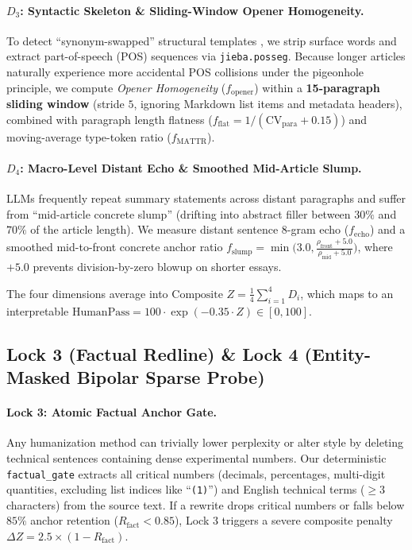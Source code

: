 \documentclass[11pt]{article}
\begin{document}
\paragraph{$D_3$: Syntactic Skeleton \& Sliding-Window Opener Homogeneity.}
To detect ``synonym-swapped'' structural templates \cite{shaib2024syntactic}, we strip surface words and extract part-of-speech (POS) sequences via \texttt{jieba.posseg}. Because longer articles naturally experience more accidental POS collisions under the pigeonhole principle, we compute \textit{Opener Homogeneity} ($f_{\text{opener}}$) within a \textbf{15-paragraph sliding window} (stride $5$, ignoring Markdown list items and metadata headers), combined with paragraph length flatness ($f_{\text{flat}} = 1 / (\text{CV}_{\text{para}} + 0.15)$) and moving-average type-token ratio ($f_{\text{MATTR}}$).

\paragraph{$D_4$: Macro-Level Distant Echo \& Smoothed Mid-Article Slump.}
LLMs frequently repeat summary statements across distant paragraphs \cite{scislop2026} and suffer from ``mid-article concrete slump'' (drifting into abstract filler between $30\%$ and $70\%$ of the article length). We measure distant sentence $8$-gram echo ($f_{\text{echo}}$) and a smoothed mid-to-front concrete anchor ratio $f_{\text{slump}} = \min\!\big(3.0, \frac{\rho_{\text{front}} + 5.0}{\rho_{\text{mid}} + 5.0}\big)$, where $+5.0$ prevents division-by-zero blowup on shorter essays.

The four dimensions average into $\text{Composite } Z = \frac{1}{4}\sum_{i=1}^4 D_i$, which maps to an interpretable $\text{HumanPass} = 100 \cdot \exp(-0.35 \cdot Z) \in [0, 100]$.

\subsection{Lock 3 (Factual Redline) \& Lock 4 (Entity-Masked Bipolar Sparse Probe)}
\paragraph{Lock 3: Atomic Factual Anchor Gate.}
Any humanization method can trivially lower perplexity or alter style by deleting technical sentences containing dense experimental numbers. Our deterministic \texttt{factual\_gate} extracts all critical numbers (decimals, percentages, multi-digit quantities, excluding list indices like ``\texttt{(1)}'') and English technical terms ($\ge 3$ characters) from the source text. If a rewrite drops critical numbers or falls below $85\%$ anchor retention ($R_{\text{fact}} < 0.85$), Lock 3 triggers a severe composite penalty $\Delta Z = 2.5 \times (1 - R_{\text{fact}})$.
\end{document}
